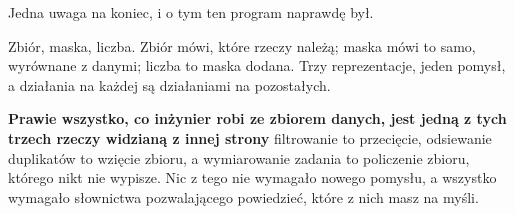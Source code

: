 \begin{fr}
Jedna uwaga na koniec, i o tym ten program naprawdę był.

Zbiór, maska, liczba. Zbiór mówi, które rzeczy należą; maska mówi to samo,
wyrównane z danymi; liczba to maska dodana. Trzy reprezentacje, jeden pomysł, a
działania na każdej są działaniami na pozostałych.

\textbf{Prawie wszystko, co inżynier robi ze zbiorem danych, jest jedną z tych
trzech rzeczy widzianą z innej strony} \dash{} filtrowanie to przecięcie,
odsiewanie duplikatów to wzięcie zbioru, a wymiarowanie zadania to policzenie
zbioru, którego nikt nie wypisze. Nic z tego nie wymagało nowego pomysłu, a
wszystko wymagało słownictwa pozwalającego powiedzieć, które z nich masz na
myśli.
\end{fr}

